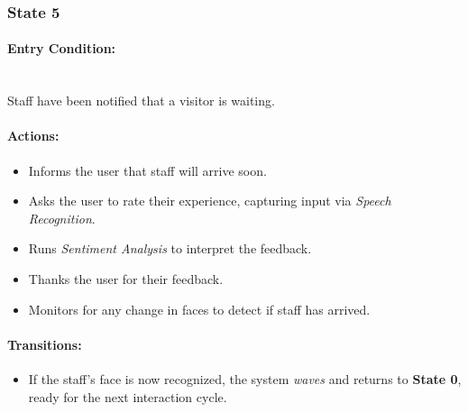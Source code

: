 \documentclass[conference]{IEEEtran}
\begin{document}
\subsubsection{State 5}
\paragraph{Entry Condition:}
\mbox{}\\
Staff have been notified that a visitor is waiting.

\paragraph{Actions:}
\begin{itemize}
  \item Informs the user that staff will arrive soon.
  \item Asks the user to rate their experience, capturing input via \emph{Speech Recognition}.
  \item Runs \emph{Sentiment Analysis} to interpret the feedback.
  \item Thanks the user for their feedback.
  \item Monitors for any change in faces to detect if staff has arrived.
\end{itemize}

\paragraph{Transitions:}
\begin{itemize}
  \item If the staff’s face is now recognized, the system \emph{waves} and returns to \textbf{State 0}, ready for the next interaction cycle.
\end{itemize}
\end{document}
